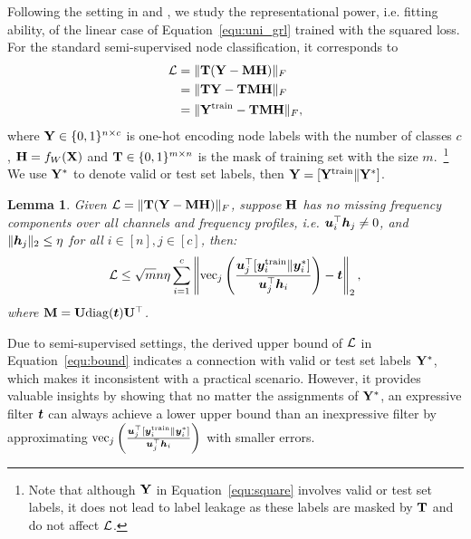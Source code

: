 \documentclass{article} %
\newtheorem{lemma}{\textbf{Lemma}}
\begin{document}
Following the setting in \citet{xu2021optimization} and \citet{JacobiConv}, we study the representational power, i.e. fitting ability, of the linear case of Equation~\ref{equ:uni_grl} trained with the squared loss.
For the standard semi-supervised node classification, it corresponds to
\begin{equation}
	\label{equ:square}
	\begin{aligned}
		{\mathcal{L}}&=\|{\mathbf{T}}({\mathbf{Y}}-{\mathbf{M}}{\mathbf{H}})\|_F\\
		&=\|{\mathbf{T}}{\mathbf{Y}}-{\mathbf{T}}{\mathbf{M}}{\mathbf{H}}\|_F\\
		&=\|{\mathbf{Y}}^{\textrm{train}}-{\mathbf{T}}{\mathbf{M}}{\mathbf{H}}\|_F,
	\end{aligned}
\end{equation}
where ${\mathbf{Y}}\in\{0,1\}^{n\times c}$ is one-hot encoding node labels with the number of classes $c$, ${\mathbf{H}}=f_W({\mathbf{X}})$ and ${\mathbf{T}}\in\{0,1\}^{m\times n}$ is the mask of training set with the size $m$.~\footnote{Note that although ${\mathbf{Y}}$ in Equation~\ref{equ:square} involves valid or test set labels, it does not lead to label leakage as these labels are masked by ${\mathbf{T}}$ and do not affect ${\mathcal{L}}$.}
We use ${\mathbf{Y}}^*$ to denote valid or test set labels, then ${\mathbf{Y}}=[{\mathbf{Y}}^{\textrm{train}}\|{\mathbf{Y}}^*]$.
\begin{lemma}
	\label{prop:loss_bound}
	Given ${\mathcal{L}}=\|{\mathbf{T}}({\mathbf{Y}}-{\mathbf{M}}{\mathbf{H}})\|_F$, suppose ${\mathbf{H}}$ has no missing frequency components over all channels and frequency profiles, i.e. ${\bm{u}}_i^{\top}{\bm{h}}_j\neq 0$, and $\|{\bm{h}}_j\|_2\leq\eta$ for all $i\in[n],j\in[c]$, then:
	\begin{equation}
		\label{equ:bound}
		\begin{aligned}
			{\mathcal{L}}\leq\sqrt{m}n\eta\sum_{i=1}^c\left\|\mathrm{vec}_j\left(\frac{{\bm{u}}_j^{\top}[{\bm{y}}^{\textrm{train}}_i\|{\bm{y}}^*_i]}{{\bm{u}}_j^{\top}{\bm{h}}_i}\right)-{\bm{t}}\right\|_2,
		\end{aligned}
	\end{equation}
	where ${\mathbf{M}}={\mathbf{U}}\mathrm{diag}({\bm{t}}){\mathbf{U}}^{\top}$.
\end{lemma}
Due to semi-supervised settings, the derived upper bound of ${\mathcal{L}}$ in Equation~\ref{equ:bound} indicates a connection with valid or test set labels ${\mathbf{Y}}^*$, which makes it inconsistent with a practical scenario.
However, it provides valuable insights by showing that no matter the assignments of ${\mathbf{Y}}^*$, an expressive filter ${\bm{t}}$ can always achieve a lower upper bound than an inexpressive filter by approximating $\mathrm{vec}_j\left(\frac{{\bm{u}}_j^{\top}[{\bm{y}}^{\textrm{train}}_i\|{\bm{y}}^*_i]}{{\bm{u}}_j^{\top}{\bm{h}}_i}\right)$ with smaller errors.
\end{document}
